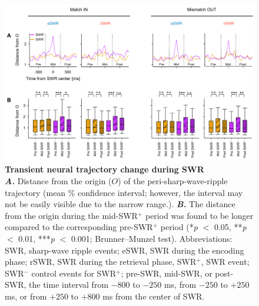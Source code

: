 \documentclass[final,3p,times,twocolumn]{elsarticle}
\begin{document}
        \clearpage
        \begin{figure}[ht]
        	\centering
            \includegraphics[width=1\textwidth]{./src/figures/.png/Figure_ID_05.png}
        	\caption{\textbf{
Transient neural trajectory change during SWR
}
\smallskip
\\
\textbf{\textit{A.}} Distance from the origin ($O$) of the peri-sharp-wave-ripple trajectory (mean \% confidence interval; however, the interval may not be easily visible due to the narrow range.).  \textbf{\textit{B.}}  The distance from the origin during the mid-SWR$^+$ period was found to be longer compared to the corresponding pre-SWR$^+$ period (*\textit{p} $<$ 0.05, **\textit{p} $<$ 0.01, ***\textit{p} $<$ 0.001; Brunner--Munzel test). Abbreviations: SWR, sharp-wave ripple events; eSWR, SWR during the encoding phase; rSWR, SWR during the retrieval phase, SWR$^+$, SWR event; SWR$^-$ control events for SWR$^+$; pre-SWR, mid-SWR, or post-SWR, the time interval from $-800$ to $-250$ ms, from $-250$ to $+250$ ms, or from $+250$ to $+800$ ms from the center of SWR.
}
        	\label{fig:05}
        \end{figure}
        \clearpage
\end{document}
